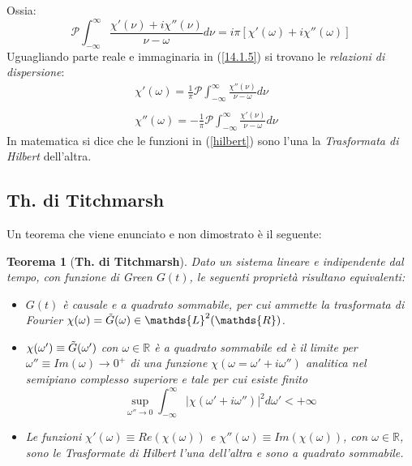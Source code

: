 \documentclass[twoside]{article}
\newtheorem{theorem}{Teorema}[section]
\begin{document}
Ossia:
\begin{equation} \label{14.1.5}
    \mathscr{P}\int_{-\infty}^{\infty}\frac{\chi'(\nu)+i\chi''(\nu)}{\nu -\omega}d\nu=i\pi [\chi'(\omega)+i\chi''(\omega)]
\end{equation}
Uguagliando parte reale e immaginaria in (\ref{14.1.5}) si trovano le \textit{relazioni di dispersione}:
\begin{equation}\label{hilbert}
    \begin{array}{lr}
         \chi'(\omega)=\frac{1}{\pi}\mathscr{P}\int_{-\infty}^{\infty}\frac{\chi''(\nu)}{\nu -\omega}d\nu  \\
         & \\
         \chi''(\omega)=-\frac{1}{\pi}\mathscr{P}\int_{-\infty}^{\infty}\frac{\chi'(\nu)}{\nu -\omega}d\nu
    \end{array}
\end{equation}
In matematica si dice che le funzioni in (\ref{hilbert}) sono l'una la \textit{Trasformata di Hilbert} dell'altra.

\subsection{Th. di Titchmarsh}
Un teorema che viene enunciato e non dimostrato è il seguente:
\begin{theorem}[\textbf{Th. di Titchmarsh}]
Dato un sistema lineare e indipendente dal tempo, con funzione di Green $G(t)$, le seguenti proprietà risultano equivalenti:
\begin{itemize}
    \item $G(t)$ è causale e a quadrato sommabile, per cui ammette la trasformata di Fourier $\chi(\omega)=\Tilde{G}(\omega) \in \mathds{L}^2(\mathds{R})$.
    \item $\chi(\omega')\equiv \Tilde{G}(\omega')$ con $\omega \in \mathds{R}$ è a quadrato sommabile ed è il limite per $\omega''\equiv Im(\omega)\to 0^+$ di una funzione $\chi(\omega=\omega'+i\omega'')$ analitica nel semipiano complesso superiore e tale per cui esiste finito
    \begin{equation}
        \sup_{\omega''\to 0}\int_{-\infty}^{\infty}|\chi(\omega'+i\omega'')|^2d\omega' < +\infty
    \end{equation}
    \item Le funzioni $\chi'(\omega)\equiv Re(\chi(\omega))$ e $\chi''(\omega)\equiv Im(\chi(\omega))$, con $\omega \in \mathds{R}$, sono le \textit{Trasformate di Hilbert} l'una dell'altra e sono a quadrato sommabile.
\end{itemize}
\end{theorem}
\end{document}

